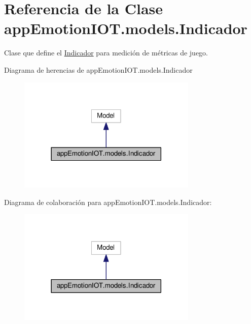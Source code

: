 \hypertarget{classappEmotionIOT_1_1models_1_1Indicador}{}\section{Referencia de la Clase app\+Emotion\+I\+O\+T.\+models.\+Indicador}
\label{classappEmotionIOT_1_1models_1_1Indicador}


Clase que define el \hyperlink{classappEmotionIOT_1_1models_1_1Indicador}{Indicador} para medición de métricas de juego.  




Diagrama de herencias de app\+Emotion\+I\+O\+T.\+models.\+Indicador
\nopagebreak
\begin{figure}[H]
\begin{center}
\leavevmode
\includegraphics[width=242pt]{classappEmotionIOT_1_1models_1_1Indicador__inherit__graph}
\end{center}
\end{figure}


Diagrama de colaboración para app\+Emotion\+I\+O\+T.\+models.\+Indicador\+:
\nopagebreak
\begin{figure}[H]
\begin{center}
\leavevmode
\includegraphics[width=242pt]{classappEmotionIOT_1_1models_1_1Indicador__coll__graph}
\end{center}
\end{figure}
